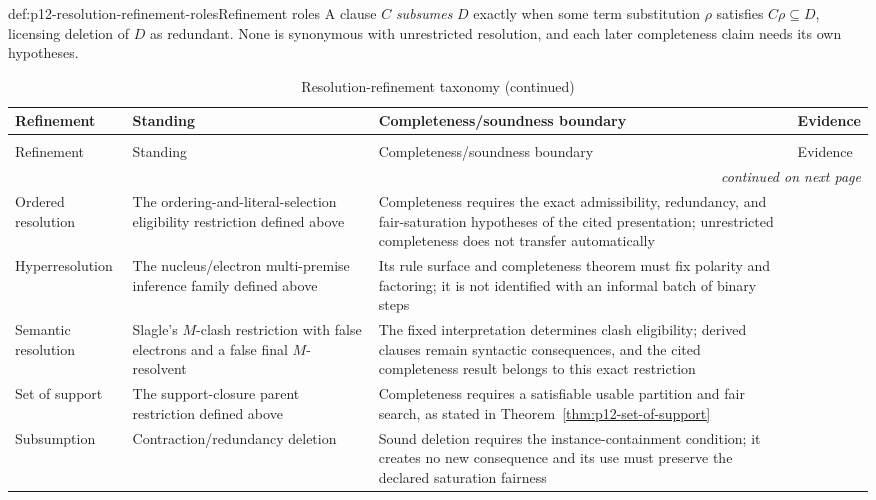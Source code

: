 \begin{hbdefinition}{def:p12-resolution-refinement-roles}{Refinement roles}
A clause \(C\) \emph{subsumes} \(D\) exactly
when some term substitution \(\rho\) satisfies \(C\rho\subseteq D\), licensing
deletion of \(D\) as redundant.  None is synonymous with unrestricted
resolution, and each later completeness claim needs its own hypotheses.
\end{hbdefinition}

\begin{longtable}{@{}p{}p{}p{}p{}@{}}
\caption{Resolution-refinement taxonomy.}
\label{tab:p12-resolution-refinements}\\
\toprule
Refinement & Standing & Completeness/soundness boundary & Evidence \\ \midrule
\endfirsthead
\caption[]{Resolution-refinement taxonomy (continued)}\\
\toprule
Refinement & Standing & Completeness/soundness boundary & Evidence \\ \midrule
\endhead
\midrule\multicolumn{4}{r}{\emph{continued on next page}}\\
\endfoot
\endlastfoot
Ordered resolution & The ordering-and-literal-selection eligibility
restriction defined above & Completeness requires the exact admissibility,
redundancy, and fair-saturation hypotheses of the cited presentation;
unrestricted completeness does not transfer automatically &
\cite{BachmairGanzinger2001} \\ \addlinespace
Hyperresolution & The nucleus/electron multi-premise inference family defined
above & Its rule surface and completeness theorem must fix polarity and
factoring; it is not identified with an informal batch of binary steps &
\cite{Robinson1965} \\ \addlinespace
Semantic resolution & Slagle's \(M\)-clash restriction with false electrons
and a false final \(M\)-resolvent & The fixed interpretation determines clash
eligibility; derived clauses remain syntactic consequences, and the cited
completeness result belongs to this exact restriction &
\cite{Slagle1967} \\ \addlinespace
Set of support & The support-closure parent restriction defined above &
Completeness requires a satisfiable usable partition and fair search, as stated
in Theorem~\ref{thm:p12-set-of-support} &
\cite{WosRobinsonCarson1965} \\ \addlinespace
Subsumption & Contraction/redundancy deletion & Sound deletion requires the
instance-containment condition; it creates no new consequence and its use must
preserve the declared saturation fairness & \cite{BachmairGanzinger2001} \\
\bottomrule
\end{longtable}

